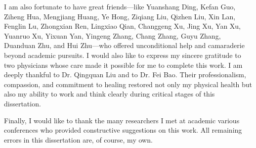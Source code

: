 \documentclass[12pt,authoryear, notitlepage]{elegantpaper}
\begin{document}
\begin{acknowledgments}
I am also fortunate to have great friends---like Yuanshang Ding, Kefan Guo, Ziheng Hua, Mengjiang Huang, Ye Hong, Ziqiang Liu, Qizhen Liu, Xin Lan, Fenglin Lu, Zhongxian Ren, Lingxiao Qian, Changgeng Xu, Jing Xu, Yan Xu, Yuanruo Xu, Yixuan Yan, Yingeng Zhang, Chang Zhang, Guyu Zhang, Duanduan Zhu, and Hui Zhu---who offered unconditional help and camaraderie beyond academic pursuits. I would also like to express my sincere gratitude to two physicians whose care made it possible for me to complete this work. I am deeply thankful to Dr. Qingquan Liu and to Dr. Fei Bao. Their professionalism, compassion, and commitment to healing restored not only my physical health but also my ability to work and think clearly during critical stages of this dissertation.

Finally, I would like to thank the many researchers I met at academic various conferences who provided constructive suggestions on this work. All remaining errors in this dissertation are, of course, my own.
\end{acknowledgments}
\end{document}
